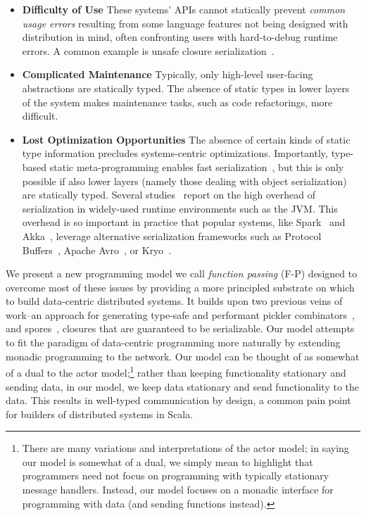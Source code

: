 \documentclass[preprint]{sigplanconf}
\theoremstyle{definition}
\theoremstyle{definition}
\begin{document}
\begin{itemize}

\item {\bf Difficulty of Use} These systems' APIs cannot statically prevent
{\em common usage errors} resulting from some language features not being
designed with distribution in mind, often confronting users with hard-to-debug
runtime errors. A common example is unsafe closure
serialization~\cite{Spores}.

\item {\bf Complicated Maintenance} Typically, only high-level user-facing
abstractions are statically typed.  The absence of static types in lower
layers of the system makes maintenance tasks, such as code refactorings, more
difficult.

\item {\bf Lost Optimization Opportunities} The absence of certain kinds of
static type information precludes systems-centric optimizations. Importantly,
type-based static meta-programming enables fast serialization~\cite{Pickling},
but this is only possible if also lower layers (namely those dealing with
object serialization) are statically typed. Several
studies~\cite{JavaSerialization, JavaRMI, MoreEfficientJavaRMI, Jaguar} report
on the high overhead of serialization in widely-used runtime environments such
as the JVM. This overhead is so important in practice that popular systems,
like Spark~\cite{Spark} and Akka~\cite{Akka}, leverage alternative
serialization frameworks such as Protocol Buffers~\cite{Protobuf}, Apache
Avro~\cite{Avro}, or Kryo~\cite{Kryo}.

\end{itemize}


We present a new programming model we call {\em function passing} (F-P)
designed to overcome most of these issues by providing a more principled
substrate on which to build data-centric distributed systems. It builds upon
two previous veins of work--an approach for generating type-safe and
performant pickler combinators~\cite{Pickling}, and spores~\cite{Spores},
closures that are guaranteed to be serializable.  Our model attempts to fit
the paradigm of data-centric programming more naturally by extending monadic
programming to the network. Our model can be thought of as somewhat of a dual
to the actor model;\footnote{There are many variations and interpretations of
the actor model; in saying our model is somewhat of a dual, we simply mean to
highlight that programmers need not focus on programming with typically
stationary message handlers. Instead, our model focuses on a monadic interface
for programming with data (and sending functions instead).} rather than
keeping functionality stationary and sending data, in our model, we keep data
stationary and send functionality to the data. This results in well-typed
communication by design, a common pain point for builders of distributed
systems in Scala.
\end{document}
